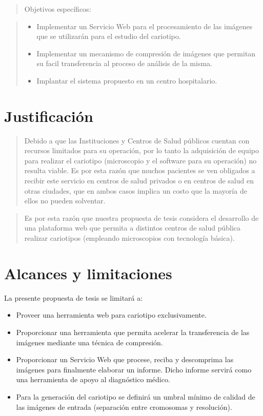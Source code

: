 \documentclass[12pt,letterpaper,titlepage]{article}
\begin{document}
\begin{quotation}
Objetivos específicos:
\end{quotation}

\begin{quotation}
\begin{itemize}\itemsep=0pt
\item Implementar un Servicio Web para el procesamiento de las imágenes que se utilizarán para el estudio del cariotipo.
\item Implementar un mecanismo de compresión de imágenes que permitan su facil transferencia al proceso de análisis de la misma.
\item Implantar el sistema propuesto en un centro hospitalario.
\end{itemize}
\end{quotation}

\section{Justificación}\label{Justi}

\begin{quotation}
Debido a que las Instituciones y Centros de Salud públicos cuentan con recursos limitados para su operación, por lo tanto la adquisición de equipo para realizar el cariotipo (microscopio y el software para su operación) no resulta viable. Es por esta razón que muchos pacientes se ven obligados a recibir este servicio en centros de salud privados o en centros de salud en otras ciudades, que en ambos casos implica un costo que la mayoría de ellos no pueden solventar. 
\end{quotation}

\begin{quotation}
Es por esta razón que nuestra propuesta de tesis considera el desarrollo de una plataforma web que permita a distintos centros de salud pública realizar cariotipos (empleando microscopios con tecnología básica). 
\end{quotation}


\section{Alcances y limitaciones}\label{limitaciones}

La presente propuesta de tesis se limitará a:

\begin{itemize}\itemsep=0pt
\item Proveer una herramienta web para cariotipo exclusivamente.
\item Proporcionar una herramienta que permita acelerar la transferencia de las imágenes mediante una técnica de compresión.
\item Proporcionar un Servicio Web que procese, reciba y descomprima las imágenes para finalmente elaborar un informe. Dicho informe servirá como una herramienta de apoyo al diagnóstico médico.
\item Para la generación del cariotipo se definirá un umbral mínimo de calidad de las imágenes de entrada (separación entre cromosomas y resolución).
\end{itemize}
\end{document}
